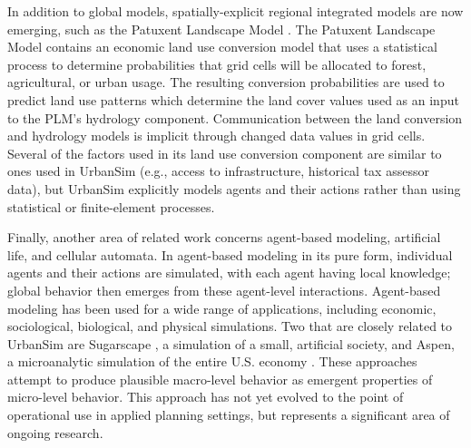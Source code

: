 In addition to global models, spatially-explicit regional integrated models
are now emerging, such as the Patuxent Landscape Model
\citep{voinov-envmodeling-1999}.  The Patuxent Landscape Model contains an
economic land use conversion model that uses a statistical process to
determine probabilities that grid cells will be allocated to forest,
agricultural, or urban usage.  The resulting conversion probabilities are
used to predict land use patterns which determine the land cover values
used as an input to the PLM's hydrology component.  Communication between
the land conversion and hydrology models is implicit through changed data
values in grid cells.  Several of the factors used in its land use
conversion component are similar to ones used in UrbanSim (e.g., access to
infrastructure, historical tax assessor data), but UrbanSim explicitly
models agents and their actions rather than using statistical or
finite-element processes.

Finally, another area of related work concerns agent-based
modeling, artificial life, and cellular automata.  In agent-based
modeling in its pure form, individual agents and their actions are
simulated, with each agent having local knowledge; global behavior
then emerges from these agent-level interactions.  Agent-based
modeling has been used for a wide range of applications, including
economic, sociological, biological, and physical simulations.  Two
that are closely related to UrbanSim are Sugarscape
\citep{epstein-book-1996,sugarscape-web}, a simulation of a small,
artificial society, and Aspen, a microanalytic simulation of the
entire U.S. economy \citep{pryor-sandia-1996,sandia-aspen-web}.
These approaches attempt to produce plausible macro-level behavior
as emergent properties of micro-level behavior.  This approach has
not yet evolved to the point of operational use in applied
planning settings, but represents a significant area of ongoing
research.

